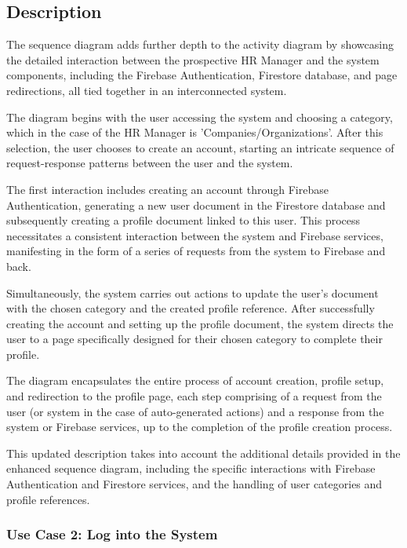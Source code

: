\newpage
\subsection*{Description}

The sequence diagram adds further depth to the activity diagram by showcasing the detailed interaction between the prospective HR Manager and the system components, including the Firebase Authentication, Firestore database, and page redirections, all tied together in an interconnected system.

The diagram begins with the user accessing the system and choosing a category, which in the case of the HR Manager is 'Companies/Organizations'. After this selection, the user chooses to create an account, starting an intricate sequence of request-response patterns between the user and the system.

The first interaction includes creating an account through Firebase Authentication, generating a new user document in the Firestore database and subsequently creating a profile document linked to this user. This process necessitates a consistent interaction between the system and Firebase services, manifesting in the form of a series of requests from the system to Firebase and back.

Simultaneously, the system carries out actions to update the user's document with the chosen category and the created profile reference. After successfully creating the account and setting up the profile document, the system directs the user to a page specifically designed for their chosen category to complete their profile.

The diagram encapsulates the entire process of account creation, profile setup, and redirection to the profile page, each step comprising of a request from the user (or system in the case of auto-generated actions) and a response from the system or Firebase services, up to the completion of the profile creation process.

This updated description takes into account the additional details provided in the enhanced sequence diagram, including the specific interactions with Firebase Authentication and Firestore services, and the handling of user categories and profile references.


\subsubsection{Use Case 2: Log into the System} 


